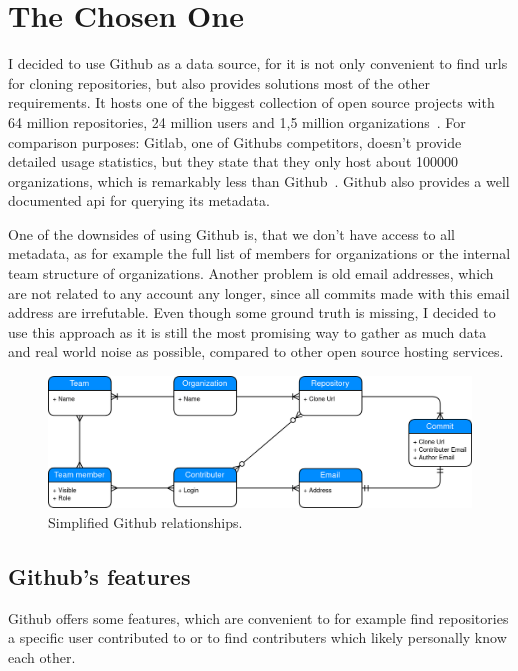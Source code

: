 \section{The Chosen One}
I decided to use Github as a data source, for it is not only convenient to find \acp{url} for cloning repositories, but also provides solutions most of the other requirements.
It hosts one of the biggest collection of open source projects with 64 million repositories, 24 million users and 1,5 million organizations~\cite{article:github-statistics}.
For comparison purposes: Gitlab, one of Githubs competitors, doesn't provide detailed usage statistics, but they state that they only host about 100000 organizations, which is remarkably less than Github~\cite{article:gitlab-help}.
Github also provides a well documented \ac{api} for querying its metadata.

One of the downsides of using Github is, that we don't have access to all metadata, as for example the full list of members for organizations or the internal team structure of organizations.
Another problem is old email addresses, which are not related to any account any longer, since all commits made with this email address are irrefutable.
Even though some ground truth is missing, I decided to use this approach as it is still the most promising way to gather as much data and real world noise as possible, compared to other open source hosting services.

\begin{figure}[H]
\includegraphics[scale=0.27]{./graphs/github-data-structure}
\centering
\caption{Simplified Github relationships.}\label{fig:github-relationship}
\end{figure}

\subsection{Github's features}
Github offers some features, which are convenient to for example find repositories a specific user contributed to or to find contributers which likely personally know each other.

